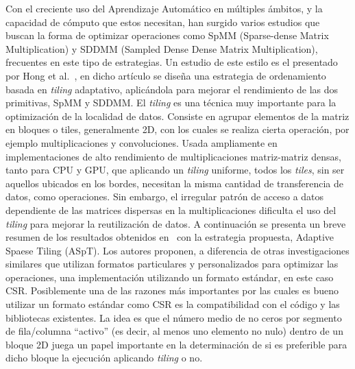 Con el creciente uso del Aprendizaje Automático en múltiples ámbitos, y la capacidad de cómputo que estos necesitan, han surgido varios estudios que buscan la forma de optimizar operaciones como SpMM (Sparse-dense Matrix Multiplication) y SDDMM (Sampled Dense Dense Matrix Multiplication), frecuentes en este tipo de estrategias. Un estudio de este estilo es el presentado por Hong et al.~\cite{Hong2019}, en dicho artículo se diseña una estrategia de ordenamiento basada en \textit{tiling} adaptativo, aplicándola para mejorar el rendimiento de las dos primitivas, SpMM y SDDMM. 
El \textit{tiling} es una técnica muy importante para la optimización de la localidad de datos. Consiste en agrupar elementos de la matriz en bloques o tiles, generalmente 2D, con los cuales se realiza cierta operación, por ejemplo multiplicaciones y convoluciones.  Usada ampliamente en implementaciones de alto rendimiento de multiplicaciones matriz-matriz densas, tanto para CPU y GPU, que aplicando un \textit{tiling} uniforme, todos los \textit{tiles}, sin ser aquellos ubicados en los bordes, necesitan la misma cantidad de transferencia de datos, como operaciones.  Sin embargo, el irregular patrón de acceso a datos dependiente de las matrices dispersas en la multiplicaciones dificulta el uso del \textit{tiling} para mejorar la reutilización de datos. A continuación se presenta un breve resumen de los resultados obtenidos en~\cite{Hong2019} con la estrategia propuesta, Adaptive Spaese Tiling (ASpT).  Los autores proponen, a diferencia de otras investigaciones similares que utilizan formatos particulares y personalizados para optimizar las operaciones, una implementación utilizando un formato estándar, en este caso CSR. Posiblemente una de las razones más importantes por las cuales es bueno utilizar un formato estándar como CSR es la compatibilidad con el código y las bibliotecas existentes. 
La idea es que el número medio de no ceros por segmento de fila/columna ``activo'' (es decir, al menos uno elemento no nulo) dentro de un bloque 2D juega un papel importante en la determinación de si es preferible para dicho bloque la ejecución aplicando \textit{tiling} o no.
